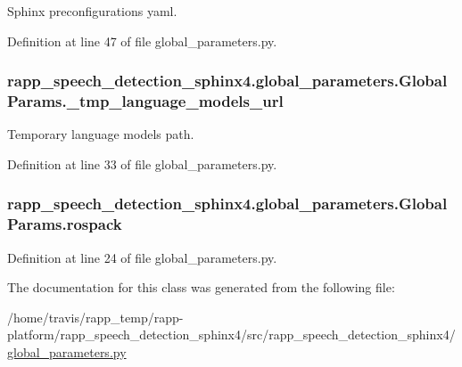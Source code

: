 Sphinx preconfigurations yaml. 



Definition at line 47 of file global\-\_\-parameters.\-py.

\hypertarget{classrapp__speech__detection__sphinx4_1_1global__parameters_1_1GlobalParams_ac21cbb95712d8873cf5c357e7006bf59}{
\subsubsection[{\-\_\-tmp\-\_\-language\-\_\-models\-\_\-url}]{\setlength{\rightskip}{0pt plus 5cm}rapp\-\_\-speech\-\_\-detection\-\_\-sphinx4.\-global\-\_\-parameters.\-Global\-Params.\-\_\-tmp\-\_\-language\-\_\-models\-\_\-url\hspace{0.3cm}{\ttfamily [private]}}}\label{classrapp__speech__detection__sphinx4_1_1global__parameters_1_1GlobalParams_ac21cbb95712d8873cf5c357e7006bf59}


Temporary language models path. 



Definition at line 33 of file global\-\_\-parameters.\-py.

\hypertarget{classrapp__speech__detection__sphinx4_1_1global__parameters_1_1GlobalParams_a544bff3ab91e6ec8c782ba2b4386ef0a}{
\subsubsection[{rospack}]{\setlength{\rightskip}{0pt plus 5cm}rapp\-\_\-speech\-\_\-detection\-\_\-sphinx4.\-global\-\_\-parameters.\-Global\-Params.\-rospack}}\label{classrapp__speech__detection__sphinx4_1_1global__parameters_1_1GlobalParams_a544bff3ab91e6ec8c782ba2b4386ef0a}


Definition at line 24 of file global\-\_\-parameters.\-py.



The documentation for this class was generated from the following file\-:\begin{DoxyCompactItemize}
\item 
/home/travis/rapp\-\_\-temp/rapp-\/platform/rapp\-\_\-speech\-\_\-detection\-\_\-sphinx4/src/rapp\-\_\-speech\-\_\-detection\-\_\-sphinx4/\hyperlink{global__parameters_8py}{global\-\_\-parameters.\-py}\end{DoxyCompactItemize}
